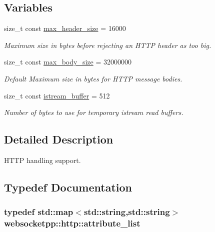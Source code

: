 \subsection*{Variables}
\begin{DoxyCompactItemize}
\item 
size\+\_\+t const \hyperlink{namespacewebsocketpp_1_1http_a514b8c48c36a9e42964f9ea35a82bc95}{max\+\_\+header\+\_\+size} = 16000
\begin{DoxyCompactList}\small\item\em Maximum size in bytes before rejecting an H\+T\+T\+P header as too big. \end{DoxyCompactList}\item 
size\+\_\+t const \hyperlink{namespacewebsocketpp_1_1http_a0cc54432842e22de04c4985cba23f54f}{max\+\_\+body\+\_\+size} = 32000000
\begin{DoxyCompactList}\small\item\em Default Maximum size in bytes for H\+T\+T\+P message bodies. \end{DoxyCompactList}\item 
size\+\_\+t const \hyperlink{namespacewebsocketpp_1_1http_a3632e5504bc2aeaa6b82d1cbffc2ec10}{istream\+\_\+buffer} = 512
\begin{DoxyCompactList}\small\item\em Number of bytes to use for temporary istream read buffers. \end{DoxyCompactList}\end{DoxyCompactItemize}


\subsection{Detailed Description}
H\+T\+T\+P handling support. 

\subsection{Typedef Documentation}
\hypertarget{namespacewebsocketpp_1_1http_a9744f4104772b987aa9e86c35ce1357b}{}
\subsubsection[{attribute\+\_\+list}]{\setlength{\rightskip}{0pt plus 5cm}typedef std\+::map$<$std\+::string,std\+::string$>$ {\bf websocketpp\+::http\+::attribute\+\_\+list}}\label{namespacewebsocketpp_1_1http_a9744f4104772b987aa9e86c35ce1357b}


